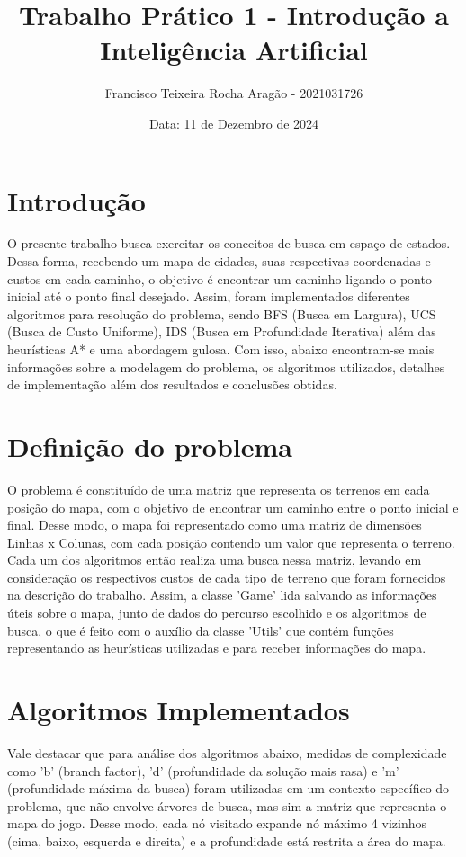 \documentclass[10pt]{extarticle} %
\title{Trabalho Prático 1 - Introdução a Inteligência Artificial}
\author{Francisco Teixeira Rocha Aragão - 2021031726}
\date{Data: 11 de Dezembro de 2024}
\begin{document}
\maketitle

\section{Introdução}

O presente trabalho busca exercitar os conceitos de busca em espaço de estados. Dessa forma, recebendo um mapa de cidades, suas respectivas coordenadas e custos em cada caminho, o objetivo é encontrar um caminho ligando o ponto inicial até o ponto final desejado. Assim, foram implementados diferentes algoritmos para resolução do problema, sendo BFS (Busca em Largura), UCS (Busca de Custo Uniforme), IDS (Busca em Profundidade Iterativa) além das heurísticas A* e uma abordagem gulosa. Com isso, abaixo encontram-se mais informações sobre a modelagem do problema, os algoritmos utilizados, detalhes de implementação além dos resultados e conclusões obtidas.

\section{Definição do problema}

O problema é constituído de uma matriz que representa os terrenos em cada posição do mapa, com o objetivo de encontrar um caminho entre o ponto inicial e final. Desse modo, o mapa foi representado como uma matriz de dimensões Linhas x Colunas, com cada posição contendo um valor que representa o terreno. Cada um dos algoritmos então realiza uma busca nessa matriz, levando em consideração os respectivos custos de cada tipo de terreno que foram fornecidos na descrição do trabalho. Assim, a classe 'Game' lida salvando as informações úteis sobre o mapa, junto de dados do percurso escolhido e os algoritmos de busca, o que é feito com o auxílio da classe 'Utils' que contém funções representando as heurísticas utilizadas e para receber informações do mapa.

\section{Algoritmos Implementados}

Vale destacar que para análise dos algoritmos abaixo, medidas de complexidade como 'b' (branch factor), 'd' (profundidade da solução mais rasa) e 'm' (profundidade máxima da busca) foram utilizadas em um contexto específico do problema, que não envolve árvores de busca, mas sim a matriz que representa o mapa do jogo. Desse modo, cada nó visitado expande nó máximo 4 vizinhos (cima, baixo, esquerda e direita) e a profundidade está restrita a área do mapa.
\end{document}

